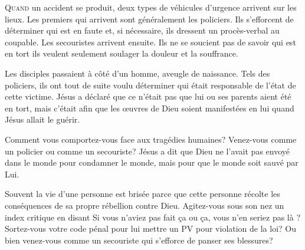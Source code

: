 \dvrule








\lettrine{Q}{uand} un accident se produit, deux types de véhicules
 d'urgence arrivent sur les lieux. Les premiers qui arrivent
 sont généralement les policiers. Ils s'efforcent de déterminer
 qui est en faute et, si nécessaire, ils dressent un procès-verbal
 au coupable. Les secouristes arrivent ensuite.
 Ils ne se 
 soucient pas de savoir qui est en tort
 \ocadr ils veulent seulement soulager la douleur et la souffrance.

Les disciples passaient à côté d'un homme, aveugle de naissance.
 Tels des policiers, ils ont tout de suite voulu déterminer
 qui était responsable de l'état de cette victime.
 Jésus a déclaré que ce n'était pas que lui ou ses parents aient été en tort,
 mais c'était afin que les \oe{}uvres de Dieu soient manifestées
 en lui quand Jésus allait le guérir.


Comment vous comportez-vous face aux tragédies humaines?
 Venez-vous comme un policier ou comme un secouriste?
 Jésus a dit que Dieu ne l'avait pas envoyé dans le monde
 pour condamner le monde, mais 
 pour que le monde soit sauvé par Lui.

Souvent la vie d'une personne est brisée parce que cette personne
 récolte les conséquences de sa propre rébellion contre Dieu.
 Agitez-vous sous son nez un index critique en disant\frcolon{} 
 \Og Si vous n'aviez pas fait \c{c}a ou \c{c}a, vous n'en seriez pas là \Fg{} ?
 Sortez-vous votre \Og code pénal \Fg{} pour lui mettre un PV
 pour violation de la loi? Ou bien venez-vous comme un secouriste
 qui s'efforce de panser ses blessures?


